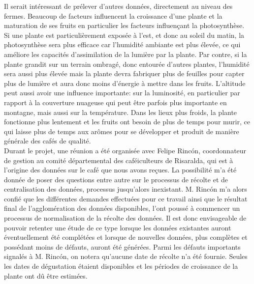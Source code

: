 



\noindent Il serait intéressant de prélever d'autres données, directement au niveau des fermes. Beaucoup de facteurs influencent la croissance d'une plante et la maturation de ses fruits en particulier les facteurs influençant la photosynthèse. Si une plante est particulièrement exposée à l'est, et donc au soleil du matin, la photosynthèse sera plus efficace car l'humidité ambiante est plus élevée, ce qui améliore les capacités d'assimilation de la lumière par la plante. Par contre, si la plante grandit sur un terrain ombragé, donc entourée d'autres plantes, l'humidité sera aussi plus élevée mais la plante devra fabriquer plus de feuilles pour capter plus de lumière et aura donc moins d'énergie à mettre dans les fruits. L'altitude peut aussi avoir une influence importante: sur la luminosité, en particulier par rapport à la couverture nuageuse qui peut être parfois plus importante en montagne, mais aussi sur la température. Dans les lieux plus froids, la plante fonctionne plus lentement et les fruits ont besoin de plus de temps pour murir, ce qui laisse plus de temps aux arômes pour se développer et produit de manière générale des cafés de qualité.  \\






\noindent Durant le projet, une réunion a été organisée avec Felipe Rincón, coordonnateur de gestion au comité départemental des caféiculteurs de Risaralda, qui est à l'origine des données sur le café que nous avons reçues. La possibilité m'a été donnée de poser des questions entre autre sur le processus de récolte et de centralisation des données, processus jusqu'alors inexistant. M. Rincón m'a alors confié que les différentes demandes effectuées pour ce travail ainsi que le résultat final de l'agglomération des données disponibles, l'ont poussé à commencer un processus de normalisation de la récolte des données. Il est donc envisageable de pouvoir retenter une étude de ce type lorsque les données existantes auront éventuellement été complétées et lorsque de nouvelles données, plus complètes et possédant moins de défauts, auront été générées. Parmi les défauts importants signalés à M. Rincón, on notera qu'aucune date de récolte n'a été fournie. Seules les dates de dégustation étaient disponibles et les périodes de croissance de la plante ont dû être estimées. \\


